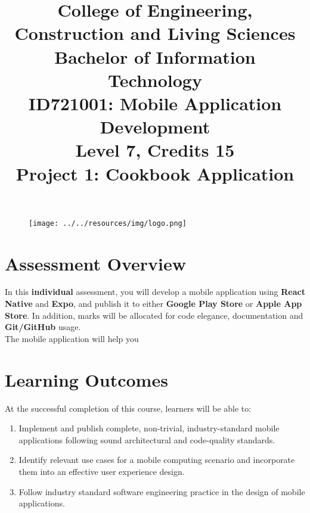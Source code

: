 \documentclass{article}
\author{}
\begin{document}
\begin{figure}
	\centering
	\texttt{[image: ../../resources/img/logo.png]}
\end{figure}

\title{College of Engineering, Construction and Living Sciences\\Bachelor of Information Technology\\ID721001: Mobile Application Development\\Level 7, Credits 15\\\textbf{Project 1: Cookbook Application}}
\date{}
\maketitle

\section*{Assessment Overview}
In this \textbf{individual} assessment, you will develop a mobile application using \textbf{React Native} and \textbf{Expo}, and publish it to either \textbf{Google Play Store} or \textbf{Apple App Store}. In addition, marks will be allocated for code elegance, documentation and \textbf{Git/GitHub} usage. \\

The mobile application will help you 

\section*{Learning Outcomes}
At the successful completion of this course, learners will be able to:
\begin{enumerate}
	\item Implement and publish complete, non-trivial, industry-standard mobile applications following sound architectural and code-quality standards.
	\item Identify relevant use cases for a mobile computing scenario and incorporate them into an effective user experience design.
	\item Follow industry standard software engineering practice in the design of mobile applications.
\end{enumerate}
\end{document}
